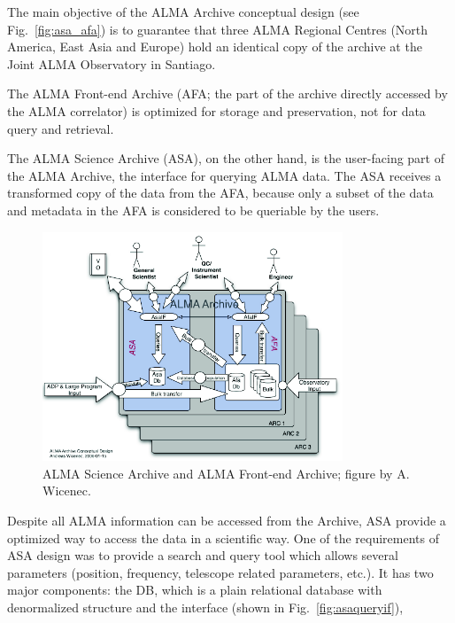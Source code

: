 The main objective of the
ALMA Archive
conceptual design (see Fig.~\ref{fig:asa_afa})
is to guarantee that three ALMA Regional Centres (North America,
East Asia %
and Europe) hold an identical copy of the archive at the Joint ALMA Observatory in Santiago. 

The ALMA Front-end Archive (AFA; the part of the archive directly accessed by the ALMA correlator)
is optimized for storage and preservation, not for data query and retrieval.

The ALMA Science Archive (ASA), on the other hand, is the user-facing part of the ALMA Archive, the interface for querying ALMA data. The ASA receives a transformed copy of the data from the AFA, because only a subset of the data and metadata in the AFA is considered to be queriable by the users.

\begin{figure}
\centering
\includegraphics[width=0.8\textwidth]{images/alma_science_archive.png}
\caption{ALMA Science Archive and ALMA Front-end Archive; figure by A. Wicenec.}
\end{figure}





Despite all ALMA information can be accessed from the Archive, ASA provide a optimized way to access the data in a scientific way. One of the requirements of ASA design was to provide a search and query tool which allows several parameters (position, frequency, telescope related parameters, etc.). It has two major components: the DB, which is a plain relational database with denormalized structure and the interface
(shown in Fig.~\ref{fig:asaqueryif}),

